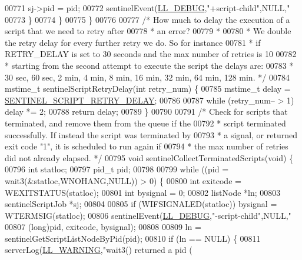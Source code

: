 \begin{DoxyCode}
{{{{{{{{{{{00771             sj->pid = pid;
00772             sentinelEvent(\hyperlink{server_8h_abcaffe365dee628fcf9fc90c69d534a1}{LL\_DEBUG},\textcolor{stringliteral}{"+script-child"},NULL,\textcolor{stringliteral}{"%
00773         \}
00774     \}
00775 \}
00776 
00777 \textcolor{comment}{/* How much to delay the execution of a script that we need to retry after}
00778 \textcolor{comment}{ * an error?}
00779 \textcolor{comment}{ *}
00780 \textcolor{comment}{ * We double the retry delay for every further retry we do. So for instance}
00781 \textcolor{comment}{ * if RETRY\_DELAY is set to 30 seconds and the max number of retries is 10}
00782 \textcolor{comment}{ * starting from the second attempt to execute the script the delays are:}
00783 \textcolor{comment}{ * 30 sec, 60 sec, 2 min, 4 min, 8 min, 16 min, 32 min, 64 min, 128 min. */}
00784 mstime\_t sentinelScriptRetryDelay(\textcolor{keywordtype}{int} retry\_num) \{
00785     mstime\_t delay = \hyperlink{sentinel_8c_a53c8edb17f50d35b3844cf0f0f61b71b}{SENTINEL\_SCRIPT\_RETRY\_DELAY};
00786 
00787     \textcolor{keywordflow}{while} (retry\_num-- > 1) delay *= 2;
00788     \textcolor{keywordflow}{return} delay;
00789 \}
00790 
00791 \textcolor{comment}{/* Check for scripts that terminated, and remove them from the queue if the}
00792 \textcolor{comment}{ * script terminated successfully. If instead the script was terminated by}
00793 \textcolor{comment}{ * a signal, or returned exit code "1", it is scheduled to run again if}
00794 \textcolor{comment}{ * the max number of retries did not already elapsed. */}
00795 \textcolor{keywordtype}{void} sentinelCollectTerminatedScripts(\textcolor{keywordtype}{void}) \{
00796     \textcolor{keywordtype}{int} statloc;
00797     pid\_t pid;
00798 
00799     \textcolor{keywordflow}{while} ((pid = wait3(&statloc,WNOHANG,NULL)) > 0) \{
00800         \textcolor{keywordtype}{int} exitcode = WEXITSTATUS(statloc);
00801         \textcolor{keywordtype}{int} bysignal = 0;
00802         listNode *ln;
00803         sentinelScriptJob *sj;
00804 
00805         \textcolor{keywordflow}{if} (WIFSIGNALED(statloc)) bysignal = WTERMSIG(statloc);
00806         sentinelEvent(\hyperlink{server_8h_abcaffe365dee628fcf9fc90c69d534a1}{LL\_DEBUG},\textcolor{stringliteral}{"-script-child"},NULL,\textcolor{stringliteral}{"%
00807             (\textcolor{keywordtype}{long})pid, exitcode, bysignal);
00808 
00809         ln = sentinelGetScriptListNodeByPid(pid);
00810         \textcolor{keywordflow}{if} (ln == NULL) \{
00811             serverLog(\hyperlink{server_8h_a31229b9334bba7d6be2a72970967a14b}{LL\_WARNING},\textcolor{stringliteral}{"wait3() returned a pid (%
}}}}}}}}}}}}}}
\end{DoxyCode}
